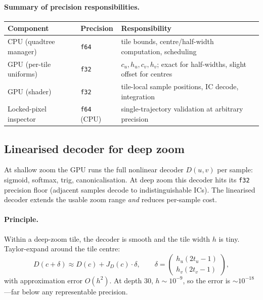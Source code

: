 \documentclass[11pt]{report}
\begin{document}
\paragraph{Summary of precision responsibilities.}
\begin{center}
\begin{tabular}{lll}
\toprule
Component & Precision & Responsibility \\
\midrule
CPU (quadtree manager) & \texttt{f64} & tile bounds, centre/half-width computation, scheduling \\
GPU (per-tile uniforms) & \texttt{f32} & $c_u,h_u,c_v,h_v$; exact for half-widths, slight offset for centres \\
GPU (shader) & \texttt{f32} & tile-local sample positions, IC decode, integration \\
Locked-pixel inspector & \texttt{f64} (CPU) & single-trajectory validation at arbitrary precision \\
\bottomrule
\end{tabular}
\end{center}

\subsection{Linearised decoder for deep zoom}
\label{sec:linearised_decoder}

At shallow zoom the GPU runs the full nonlinear decoder $D(u,v)$ per sample: sigmoid, softmax, trig, canonicalisation. At deep zoom this decoder hits its \texttt{f32} precision floor (adjacent samples decode to indistinguishable ICs). The linearised decoder extends the usable zoom range \emph{and} reduces per-sample cost.

\paragraph{Principle.} Within a deep-zoom tile, the decoder is smooth and the tile width $h$ is tiny. Taylor-expand around the tile centre:
\[
\boxed{D(c+\delta)\approx D(c)+J_D(c)\cdot\delta,\qquad \delta=\begin{pmatrix}h_u(2t_u-1)\\h_v(2t_v-1)\end{pmatrix},}
\]
with approximation error $O(h^2)$. At depth 30, $h\sim 10^{-9}$, so the error is $\sim 10^{-18}$---far below any representable precision.
\end{document}
